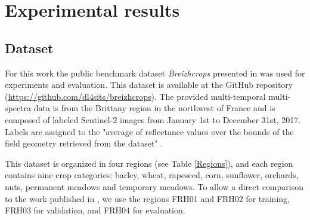 \documentclass[journal,article,submit,pdftex,moreauthors]{Definitions/mdpi}
\begin{document}
\section{Experimental results}
\subsection{Dataset}\label{dataset}
For this work the public benchmark dataset \textit{Breizhcrops} presented in \cite{Russwurm2020} was used for experiments and evaluation. This dataset is available at the GitHub repository
(\url{https://github.com/dl4sits/breizhcrops}). The provided multi-temporal multi-spectra data is from the Brittany region in the northwest of France and is composed of labeled Sentinel-2 images from January 1st to December 31st, 2017. Labels are assigned to the "average of reflectance values over the bounds of the field geometry retrieved from the dataset" \cite{Russwurm2020}.

This dataset is organized in four regions (see Table \ref{Regions}),
and each region contains nine crop categories: barley, wheat, rapeseed, corn, sunflower, orchards, nuts, permanent meadows and temporary meadows.
To allow a direct comparison to the work published in \cite{Russwurm2020}, we use the regions FRH01 and FRH02 for training, FRH03 for validation, and FRH04 for evaluation.
\end{document}
